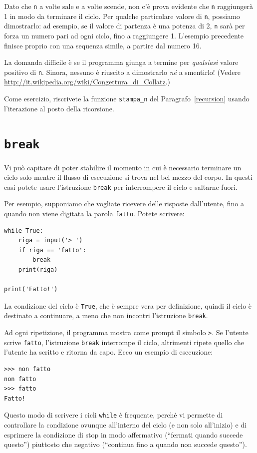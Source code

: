 \documentclass[10pt]{book}
\begin{document}
Dato che {\tt n} a volte sale e a volte scende, non c'è prova evidente che {\tt n} raggiungerà 1 in modo da terminare il ciclo. Per qualche particolare valore di {\tt n}, possiamo dimostrarlo: ad esempio, se il valore di partenza è una potenza di 2, {\tt n} sarà per forza un numero pari ad ogni ciclo, fino a raggiungere 1. L'esempio precedente finisce proprio con una sequenza simile, a partire dal numero 16.

La domanda difficile è se il programma giunga a termine per {\em qualsiasi} valore positivo di {\tt n}. Sinora, nessuno è riuscito a dimostrarlo {\em né} a smentirlo!  (Vedere \url{http://it.wikipedia.org/wiki/Congettura_di_Collatz}.)

Come esercizio, riscrivete la funzione \verb"stampa_n" del Paragrafo~\ref{recursion} usando l'iterazione al posto della ricorsione.




\section{{\tt break}}

Vi può capitare di poter stabilire il momento in cui è necessario terminare un ciclo solo mentre il flusso di esecuzione si trova nel bel mezzo del corpo. In questi casi potete usare l'istruzione {\tt break} per interrompere il ciclo e saltarne fuori.

Per esempio, supponiamo che vogliate ricevere delle risposte dall'utente, fino a quando non viene digitata la parola {\tt fatto}.  Potete scrivere:

\begin{verbatim}
while True:
    riga = input('> ')
    if riga == 'fatto':
        break
    print(riga)

print('Fatto!')
\end{verbatim}
%
La condizione del ciclo è {\tt True}, che è sempre vera per definizione, quindi il ciclo è destinato a continuare, a meno che non incontri l'istruzione {\tt break}.

Ad ogni ripetizione, il programma mostra come prompt il simbolo {\tt >}.
Se l'utente scrive {\tt fatto}, l'istruzione {\tt break} interrompe il ciclo, altrimenti ripete quello che l'utente ha scritto e ritorna da capo. Ecco un esempio di esecuzione:

\begin{verbatim}
>>> non fatto
non fatto
>>> fatto
Fatto!
\end{verbatim}
%
Questo modo di scrivere i cicli {\tt while} è frequente, perché vi permette di controllare la condizione ovunque all'interno del ciclo (e non solo all'inizio) e di esprimere la condizione di stop in modo affermativo (``fermati quando succede questo'') piuttosto che negativo (``continua fino a quando non succede questo'').
\end{document}
